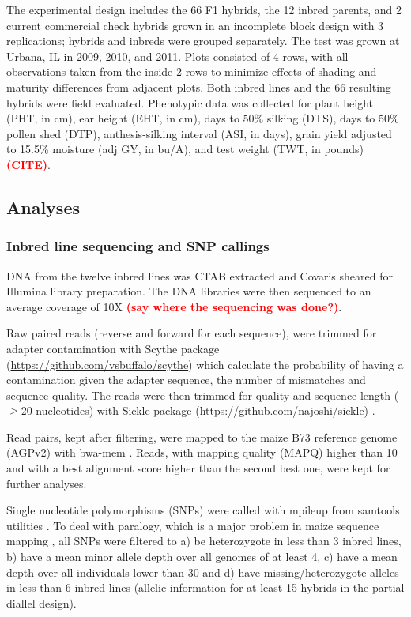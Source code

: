 \documentclass[10pt]{article}
\newcommand{\sme}[1]{\textcolor{red}{\bf #1}}
\begin{document}
The experimental design includes the 66 F1 hybrids, the 12 inbred parents, and 2 current commercial check hybrids grown in an incomplete block design with 3 replications; hybrids and inbreds were grouped separately. The test was grown at Urbana, IL in 2009, 2010, and 2011.  Plots consisted of 4 rows, with all observations taken from the inside 2 rows to minimize effects of shading and maturity differences from adjacent plots. Both inbred lines and the 66 resulting hybrids were field evaluated. Phenotypic data was collected for plant height (PHT, in cm), ear height (EHT, in cm), days to 50\% silking (DTS), days to 50\% pollen shed (DTP), anthesis-silking interval (ASI, in days), grain yield adjusted to 15.5\% moisture (adj GY, in bu/A), and test weight (TWT, in pounds) \sme{(CITE)}.%

\subsection*{Analyses}

\subsubsection*{Inbred line sequencing and SNP callings}

DNA from the twelve inbred lines was CTAB extracted \citep{Doyle1987} and Covaris sheared for Illumina library preparation. The DNA libraries were then sequenced to an average coverage of 10X \sme{(say where the sequencing was done?)}.

Raw paired reads (reverse and forward for each sequence), were trimmed for adapter contamination with Scythe package (\url{https://github.com/vsbuffalo/scythe}) which calculate the probability of having a contamination given the adapter sequence, the number of mismatches and sequence quality. The reads were then trimmed for quality and sequence length ($\geq 20$ nucleotides) with Sickle package (\url{https://github.com/najoshi/sickle}) .

Read pairs, kept after filtering,  were mapped to the maize B73 reference genome (AGPv2) with bwa-mem \citep{Li2009B}. Reads, with mapping quality (MAPQ) higher than 10 and with a best alignment score higher than the second best one, were kept for further analyses.

Single nucleotide polymorphisms (SNPs) were called with mpileup from samtools utilities \citep{Li2009}. To deal with paralogy, which is a major problem in maize sequence mapping \citep{Chia2012}, all SNPs were filtered to a) be heterozygote in less than 3 inbred lines, b) have a mean minor allele depth over all genomes of at least 4, c) have a mean depth over all individuals lower than 30 and d) have missing/heterozygote alleles in less than 6 inbred lines (allelic information for at least 15 hybrids in the partial diallel design). 
\end{document}
